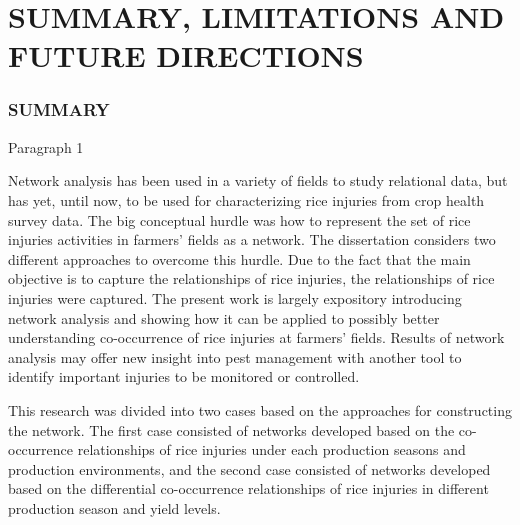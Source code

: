 \chapter{SUMMARY, LIMITATIONS AND FUTURE DIRECTIONS}


\subsection{SUMMARY}

Paragraph 1

Network analysis has been used in a variety of fields to study relational data, but has yet, until now, to be used for characterizing rice injuries from crop health survey data. The big conceptual hurdle was how to represent the set of rice injuries activities in farmers’ fields as a network. The dissertation considers two different approaches to overcome this hurdle. Due to the fact that the main objective is to capture the relationships of rice injuries, the relationships of rice injuries were captured. The present work is largely expository introducing network analysis and showing how it can be applied to possibly better understanding co-occurrence of rice injuries at farmers’ fields. Results of network analysis may offer new insight into pest management with another tool to identify important injuries to be monitored or controlled.

This research was divided into two cases based on the approaches for constructing the network. The first case consisted of networks developed based on the co-occurrence relationships of rice injuries under each production seasons and production environments, and the second case consisted of networks developed based on the differential co-occurrence relationships of rice injuries in different production season and yield levels. 

